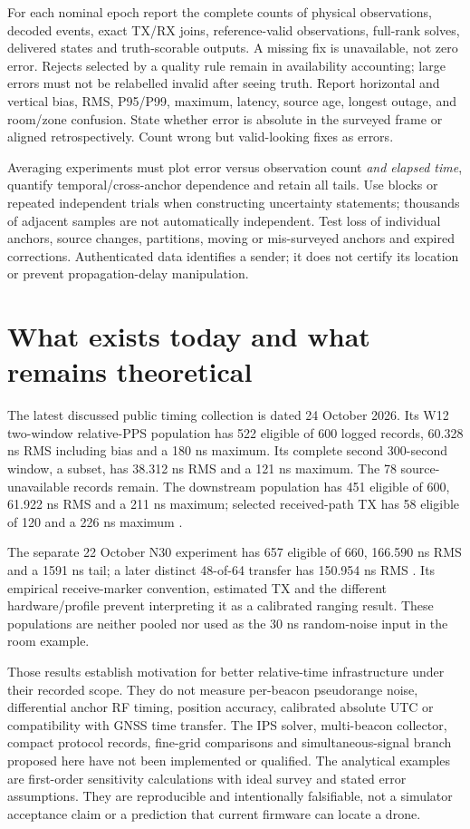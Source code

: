 \documentclass[11pt,letterpaper]{article}
\begin{document}
For each nominal epoch report the complete counts of physical observations, decoded events, exact TX/RX joins, reference-valid observations, full-rank solves, delivered states and truth-scorable outputs. A missing fix is unavailable, not zero error. Rejects selected by a quality rule remain in availability accounting; large errors must not be relabelled invalid after seeing truth. Report horizontal and vertical bias, RMS, P95/P99, maximum, latency, source age, longest outage, and room/zone confusion. State whether error is absolute in the surveyed frame or aligned retrospectively. Count wrong but valid-looking fixes as errors.

Averaging experiments must plot error versus observation count \emph{and elapsed time}, quantify temporal/cross-anchor dependence and retain all tails. Use blocks or repeated independent trials when constructing uncertainty statements; thousands of adjacent samples are not automatically independent. Test loss of individual anchors, source changes, partitions, moving or mis-surveyed anchors and expired corrections. Authenticated data identifies a sender; it does not certify its location or prevent propagation-delay manipulation.

\section{What exists today and what remains theoretical}\label{sec:evidence}
The latest discussed public timing collection is dated 24 October 2026. Its W12 two-window relative-PPS population has 522 eligible of 600 logged records, 60.328 ns RMS including bias and a 180 ns maximum. Its complete second 300-second window, a subset, has 38.312 ns RMS and a 121 ns maximum. The 78 source-unavailable records remain. The downstream population has 451 eligible of 600, 61.922 ns RMS and a 211 ns maximum; selected received-path TX has 58 eligible of 120 and a 226 ns maximum \cite{w12}.

The separate 22 October N30 experiment has 657 eligible of 660, 166.590 ns RMS and a 1591 ns tail; a later distinct 48-of-64 transfer has 150.954 ns RMS \cite{fine}. Its empirical receive-marker convention, estimated TX and the different hardware/profile prevent interpreting it as a calibrated ranging result. These populations are neither pooled nor used as the 30 ns random-noise input in the room example.

Those results establish motivation for better relative-time infrastructure under their recorded scope. They do not measure per-beacon pseudorange noise, differential anchor RF timing, position accuracy, calibrated absolute UTC or compatibility with GNSS time transfer. The IPS solver, multi-beacon collector, compact protocol records, fine-grid comparisons and simultaneous-signal branch proposed here have not been implemented or qualified. The analytical examples are first-order sensitivity calculations with ideal survey and stated error assumptions. They are reproducible and intentionally falsifiable, not a simulator acceptance claim or a prediction that current firmware can locate a drone.
\end{document}
